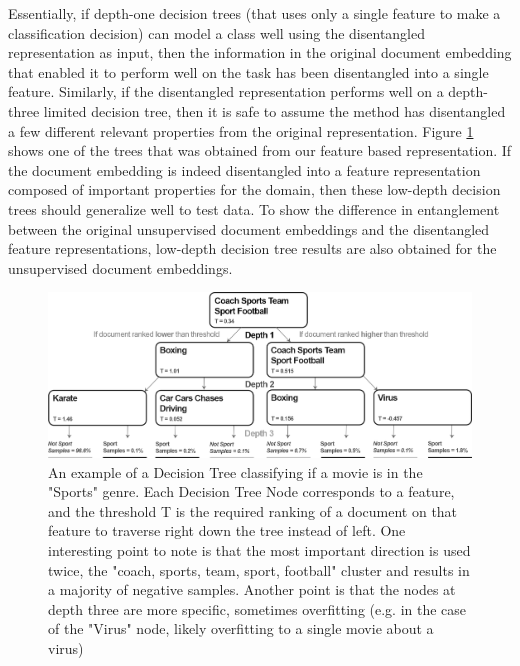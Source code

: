 Essentially, if depth-one decision trees (that uses only a single feature to make a classification decision) can model a class well using the disentangled representation as input, then the information in  the original document embedding that enabled it to perform well on the task has been disentangled into a single feature. Similarly, if the disentangled representation performs well on a depth-three limited decision tree, then it is safe to assume the method has disentangled a few different relevant properties from the original representation.   Figure \ref{ch3:DecisionTree} shows one of the trees that was obtained from our feature based representation.  If the document embedding is indeed disentangled into a feature representation composed of important properties for the domain, then these low-depth decision trees should generalize well to test data. To show the difference in entanglement between the original unsupervised document embeddings and the disentangled feature representations, low-depth decision tree results are also obtained for the unsupervised document embeddings. 




\begin{figure}[t]
	\includegraphics[width=450px]{images/decision_tree_ex.png}
	\centering
	\caption{An example of a Decision Tree classifying if a movie is in the "Sports" genre. Each Decision Tree Node corresponds to a feature, and the threshold T is the required ranking of a document on that feature to traverse right down the tree instead of left. One interesting point to note is that the most important direction is used twice, the "coach, sports, team, sport, football" cluster and results in a majority of negative samples. Another point is that the nodes at depth three are more specific, sometimes overfitting (e.g. in the case of the "Virus" node, likely overfitting to a single movie about a virus) }\label{ch3:DecisionTree}
\end{figure}




